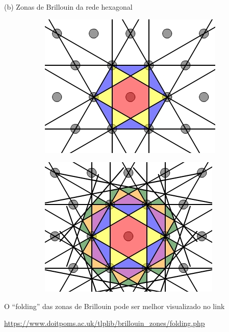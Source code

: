 \documentclass[aspectratio=169]{beamer}
\begin{document}


\begin{frame}{(b) Zonas de Brillouin da rede hexagonal}

\begin{figure}[H]
\centering
\begin{subfigure}{.45\textwidth}
  \centering
  \includegraphics[width=\linewidth]{fig/hexbz_construct-7.png}
\end{subfigure}%
\quad \quad
\begin{subfigure}{.45\textwidth}
  \centering
  \includegraphics[width=\linewidth]{fig/hexbz_construct-8.png}
\end{subfigure}
\end{figure}

O ``folding'' das zonas de Brillouin pode ser melhor visualizado no link

\textcolor{blue}{\url{https://www.doitpoms.ac.uk/tlplib/brillouin_zones/folding.php}}

\end{frame}
\end{document}
